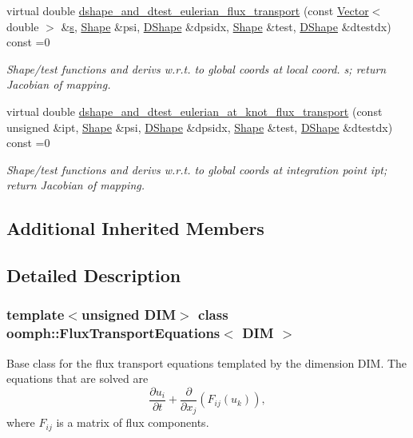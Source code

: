 \begin{DoxyCompactItemize}
virtual double \hyperlink{classoomph_1_1FluxTransportEquations_a9bdf6ab17431bcac6eac11bce917cdde}{dshape\+\_\+and\+\_\+dtest\+\_\+eulerian\+\_\+flux\+\_\+transport} (const \hyperlink{classoomph_1_1Vector}{Vector}$<$ double $>$ \&\hyperlink{cfortran_8h_ab7123126e4885ef647dd9c6e3807a21c}{s}, \hyperlink{classoomph_1_1Shape}{Shape} \&psi, \hyperlink{classoomph_1_1DShape}{D\+Shape} \&dpsidx, \hyperlink{classoomph_1_1Shape}{Shape} \&test, \hyperlink{classoomph_1_1DShape}{D\+Shape} \&dtestdx) const =0
\begin{DoxyCompactList}\small\item\em Shape/test functions and derivs w.\+r.\+t. to global coords at local coord. s; return Jacobian of mapping. \end{DoxyCompactList}\item 
virtual double \hyperlink{classoomph_1_1FluxTransportEquations_a21e7b05ac839ce2db818356ee6906e1c}{dshape\+\_\+and\+\_\+dtest\+\_\+eulerian\+\_\+at\+\_\+knot\+\_\+flux\+\_\+transport} (const unsigned \&ipt, \hyperlink{classoomph_1_1Shape}{Shape} \&psi, \hyperlink{classoomph_1_1DShape}{D\+Shape} \&dpsidx, \hyperlink{classoomph_1_1Shape}{Shape} \&test, \hyperlink{classoomph_1_1DShape}{D\+Shape} \&dtestdx) const =0
\begin{DoxyCompactList}\small\item\em Shape/test functions and derivs w.\+r.\+t. to global coords at integration point ipt; return Jacobian of mapping. \end{DoxyCompactList}\end{DoxyCompactItemize}
\subsection*{Additional Inherited Members}


\subsection{Detailed Description}
\subsubsection*{template$<$unsigned D\+IM$>$\newline
class oomph\+::\+Flux\+Transport\+Equations$<$ D\+I\+M $>$}

Base class for the flux transport equations templated by the dimension D\+IM. The equations that are solved are \[ \frac{\partial u_{i}}{\partial t} + \frac{\partial}{\partial x_{j}} \left(F_{ij}(u_{k})\right), \] where $ F_{ij} $ is a matrix of flux components. 

